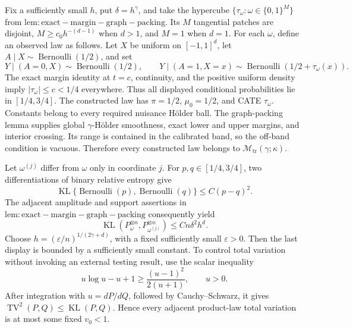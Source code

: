 Fix a sufficiently small \(h\), put \(\delta=h^\gamma\), and take the hypercube \(\{\tau_\omega:\omega\in\{0,1\}^M\}\) from \(\mathrm{lem:exact-margin-graph-packing}\). Its \(M\) tangential patches are disjoint, \(M\ge c_0h^{-(d-1)}\) when \(d>1\), and \(M=1\) when \(d=1\). For each \(\omega\), define an observed law as follows. Let \(X\) be uniform on \([-1,1]^d\), let \(A\mid X\sim\operatorname{Bernoulli}(1/2)\), and set
\[
 Y\mid(A=0,X)\sim\operatorname{Bernoulli}(1/2),
 \qquad
 Y\mid(A=1,X=x)\sim\operatorname{Bernoulli}(1/2+\tau_\omega(x)).
\]
The exact margin identity at \(t=c\), continuity, and the positive uniform density imply \(|\tau_\omega|\le c<1/4\) everywhere. Thus all displayed conditional probabilities lie in \([1/4,3/4]\). The constructed law has \(\pi=1/2\), \(\mu_0=1/2\), and CATE \(\tau_\omega\). Constants belong to every required nuisance Hölder ball. The graph-packing lemma supplies global \(\gamma\)-Hölder smoothness, exact lower and upper margins, and interior crossing. Its range is contained in the calibrated band, so the off-band condition is vacuous. Therefore every constructed law belongs to \(\mathcal M_{\mathrm{tr}}(\gamma;\kappa)\).

Let \(\omega^{(j)}\) differ from \(\omega\) only in coordinate \(j\). For \(p,q\in[1/4,3/4]\), two differentiations of binary relative entropy give
\[
 \operatorname{KL}\{\operatorname{Bernoulli}(p),\operatorname{Bernoulli}(q)\}
 \le C(p-q)^2.
\]
The adjacent amplitude and support assertions in \(\mathrm{lem:exact-margin-graph-packing}\) consequently yield
\[
 \operatorname{KL}(P_\omega^{\otimes n},P_{\omega^{(j)}}^{\otimes n})
 \le Cn\delta^2h^d.
\]
Choose \(h=(\varepsilon/n)^{1/(2\gamma+d)}\), with a fixed sufficiently small \(\varepsilon>0\). Then the last display is bounded by a sufficiently small constant. To control total variation without invoking an external testing result, use the scalar inequality
\[
 u\log u-u+1\ge\frac{(u-1)^2}{2(u+1)},
 \qquad u>0.
\]
After integration with \(u=dP/dQ\), followed by Cauchy--Schwarz, it gives \(\operatorname{TV}^2(P,Q)\le\operatorname{KL}(P,Q)\). Hence every adjacent product-law total variation is at most some fixed \(v_0<1\).

